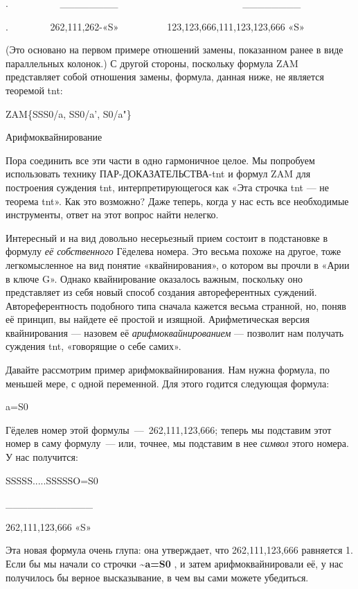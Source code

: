 \documentclass[../main.tex]{subfiles}
\begin{document}
.~~~~~~~~~ ~\textbar\_\_\_\_\_\_\_\_\textbar~~~~~~~~~~~~~~~~~~~~~~~~ ~\textbar\_\_\_\_\_\_\_\_\textbar{}

.~~~~~~~ ~262,111,262-«S»~~~~~~~~~~123,123,666,111,123,123,666 «S»

(Это основано на первом примере отношений замены, показанном ранее в виде параллельных колонок.) С другой стороны, поскольку формула ZAM представляет собой отношения замены, формула, данная ниже, не является теоремой \acs{tnt}:

ZAM\{SSS0/a, SS0/a', S0/a"\}

Арифмоквайнирование

Пора соединить все эти части в одно гармоничное целое. Мы попробуем использовать технику ПАР-ДОКАЗАТЕЛЬСТВА-\acs{tnt} и формул ZAM для построения суждения \acs{tnt}, интерпретирующегося как «Эта строчка \acs{tnt} --- не теорема \acs{tnt}». Как это возможно? Даже теперь, когда у нас есть все необходимые инструменты, ответ на этот вопрос найти нелегко.

Интересный и на вид довольно несерьезный прием состоит в подстановке в формулу \emph{её собственного} Гёделева номера. Это весьма похоже на другое, тоже легкомысленное на вид понятие «квайнирования», о котором вы прочли в «Арии в ключе G». Однако квайнирование оказалось важным, поскольку оно представляет из себя новый способ создания автореферентных суждений. Автореферентность подобного типа сначала кажется весьма странной, но, поняв её принцип, вы найдете её простой и изящной. Арифметическая версия квайнирования --- назовем её \emph{арифмоквайнированием} --- позволит нам получать суждения \acs{tnt}, «говорящие о себе самих».

Давайте рассмотрим пример арифмоквайнирования. Нам нужна формула, по меньшей мере, с одной переменной. Для этого годится следующая формула:

a=S0

Гёделев номер этой формулы~---~262,111,123,666; теперь мы подставим этот номер в саму формулу~--- или, точнее, мы подставим в нее \emph{символ} этого номера. У нас получится:

SSSSS.....SSSSSO=S0

\textbar\_\_\_\_\_\_\_\_\_\_\_\_\textbar{}

262,111,123,666 «S»

Эта новая формула очень глупа: она утверждает, что 262,111,123,666 равняется 1. Если бы мы начали со строчки \textbf{\textasciitilde a=S0} , и затем арифмоквайнировали её, у нас получилось бы верное высказывание, в чем вы сами можете убедиться.
\end{document}
